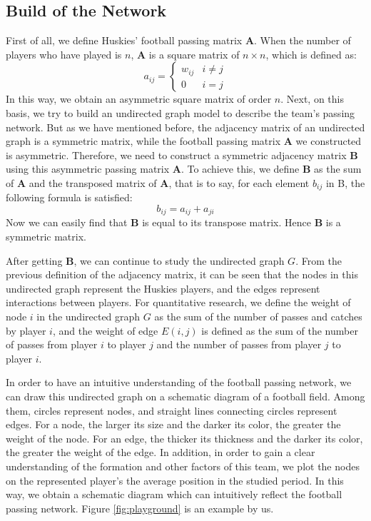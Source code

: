 \documentclass{mcmthesis}
\begin{document}
\subsection{Build of the Network}
	First of all, we define Huskies' football passing matrix $\textbf{A}$.  When the number of players who have played is $n$, $\textbf{A}$ is a square matrix of $n \times n$, which is defined as:
	\begin{equation}\label{eq:Mat_A}
		a_{ij} =
		\begin{cases}
			w_{ij}& \text{$i \neq j$}\\
			0& \text{$i = j$}
		\end{cases}
	\end{equation}
	In this way, we obtain an asymmetric square matrix of order $n$.  Next, on this basis, we try to build an undirected graph model to describe the team's passing network.  But as we have mentioned before, the adjacency matrix of an undirected graph is a symmetric matrix, while the football passing matrix $\textbf{A}$ we constructed is asymmetric.  Therefore, we need to construct a symmetric adjacency matrix $\textbf{B}$ using this asymmetric passing matrix $\textbf{A}$.  To achieve this, we define $\textbf{B}$ as the sum of $\textbf{A}$ and the transposed matrix of $\textbf{A}$, that is to say, for each element $b_{ij}$ in B, the following formula is satisfied:
	\begin{equation}
		\label{eq:Mat_B}
		b_{ij} = a_{ij} + a_{ji}
	\end{equation}
	Now we can easily find that $\textbf{B}$ is equal to its transpose matrix.  Hence $\textbf{B}$ is a symmetric matrix.

	After getting $\textbf{B}$, we can continue to study the undirected graph $G$.  From the previous definition of the adjacency matrix, it can be seen that the nodes in this undirected graph represent the Huskies players, and the edges represent interactions between players.  For quantitative research, we define the weight of node $i$ in the undirected graph $G$ as the sum of the number of passes and catches by player $i$, and the weight of edge $E (i, j)$ is defined as the sum of the number of passes from player $i$ to player $j$ and the number of passes from player $j$ to player $i$.
	
	In order to have an intuitive understanding of the football passing network, we can draw this undirected graph on a schematic diagram of a football field.  Among them, circles represent nodes, and straight lines connecting circles represent edges.  For a node, the larger its size and the darker its color, the greater the weight of the node.  For an edge, the thicker its thickness and the darker its color, the greater the weight of the edge.  In addition, in order to gain a clear understanding of the formation and other factors of this team, we plot the nodes on the represented player's the average position in the studied period.  In this way, we obtain a schematic diagram which can intuitively reflect the football passing network.  Figure \ref{fig:playground} is an example by us.
	
\end{document}

